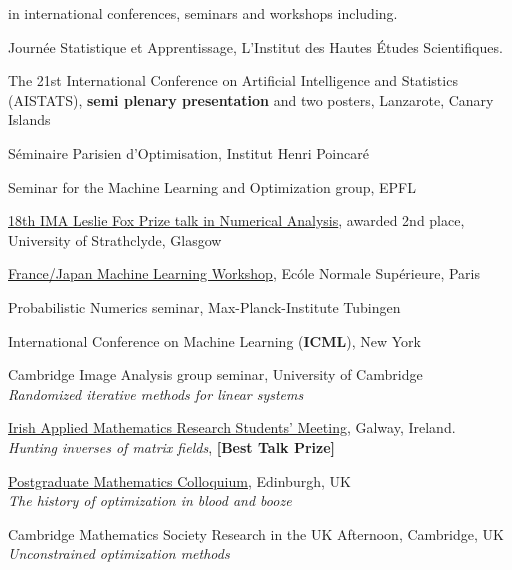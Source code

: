 	\begin{bibsection}	
\item [Over {\bf 30 talks}] in international conferences, seminars and workshops including.
\item [2019]  Journ\'ee Statistique et Apprentissage, L'Institut des Hautes \'Etudes Scientifiques.

\item [2018] The 21st International Conference on
Artificial Intelligence and Statistics (AISTATS), {\bf semi plenary presentation} and two posters, Lanzarote, Canary Islands

\item {Séminaire Parisien d'Optimisation},  Institut Henri Poincaré


\item Seminar for the Machine Learning and Optimization group, {EPFL} %
		
		\item [2017]  \href{http://people.maths.ox.ac.uk/wathen/fox/prize.php}{18th IMA Leslie Fox Prize talk in Numerical Analysis}, awarded 2nd place, University of Strathclyde, Glasgow
\item  \href{http://fjml.marcocuturi.net/speakers/}{France/Japan Machine Learning Workshop}, Ec\'ole Normale Sup\'erieure, Paris
		\item Probabilistic Numerics seminar, Max-Planck-Institute Tubingen
		\item [2016]		
        International Conference on Machine Learning ({\bf ICML}), New York
		\item Cambridge Image Analysis group seminar, University of Cambridge \\
		 \emph{Randomized iterative methods for linear systems}
\item[ 2014] 
 \href{http://www.maths.nuigalway.ie/SIAM-Galway/PG-Conf-14/}{Irish Applied Mathematics Research Students' Meeting}, Galway, Ireland.\\
 \emph{Hunting inverses of matrix fields},
  {\bf [Best Talk Prize]} 
 \item \href{https://info.maths.ed.ac.uk/pg-pages/colloquium/colloquium_1415_1.html}{Postgraduate Mathematics Colloquium}, Edinburgh, UK\\
\emph{The history of optimization in blood and booze}
\item	  Cambridge Mathematics Society Research in the UK Afternoon, Cambridge, UK \\  \emph{Unconstrained optimization methods}
\end{bibsection}	
		